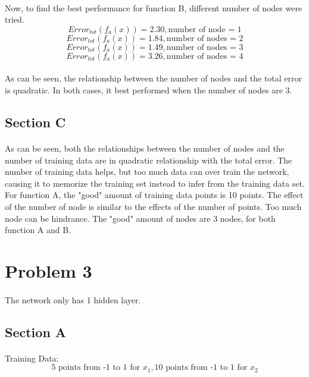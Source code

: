 \documentclass[12pt, letterpaper]{report}
\begin{document}
\paragraph*{} Now, to find the best performance for function B, different number of nodes were tried.
\[ Error_{tot}(f_a(x)) = 2.30, \text{number of node = 1} \]
\[ Error_{tot}(f_a(x)) = 1.84, \text{number of nodes = 2} \]
\[ Error_{tot}(f_a(x)) = 1.49, \text{number of nodes = 3} \]
\[ Error_{tot}(f_a(x)) = 3.26, \text{number of nodes = 4} \]
\paragraph*{} As can be seen, the relationship between the number of nodes and the total error is quadratic. In both cases, it best performed when the number of nodes are 3.
\subsection*{Section C}
\paragraph*{} As can be seen, both the relationships between the number of nodes and the number of training data are in quadratic relationship with the total error. The number of training data helps, but too much data can over train the network, causing it to memorize the training set instead to infer from the training data set. For function A, the "good" amount of training data points is 10 points. The effect of the number of node is similar to the effects of the number of points. Too much node can be hindrance. The "good" amount of nodes are 3 nodes, for both function A and B.
\section*{Problem 3}
\paragraph*{} The network only has 1 hidden layer.
\subsection*{Section A}
\paragraph*{} Training Data:
\[\text{5 points from -1 to 1 for }x_1, \text{10 points from -1 to 1 for }x_2\]
\end{document}
